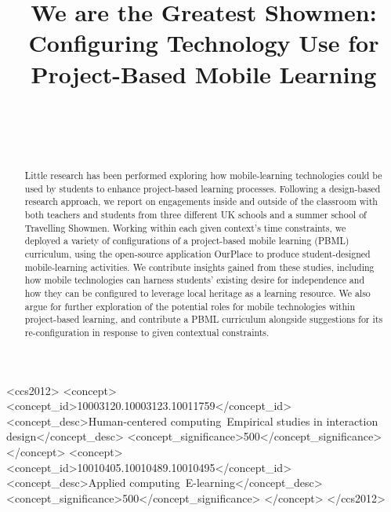 \documentclass[,hyphens]{sigchi}
\begin{document}
\title{We are the Greatest Showmen: Configuring Technology Use for Project-Based Mobile Learning}

\author{%
  \\
  \\
  \\
}

\maketitle

\begin{abstract}
Little research has been performed exploring how mobile-learning technologies could be used by students to enhance project-based learning processes. Following a design-based research approach, we report on engagements inside and outside of the classroom with both teachers and students from three different UK schools and a summer school of Travelling Showmen. Working within each given context's time constraints, we deployed a variety of configurations of a project-based mobile learning (PBML) curriculum, using the open-source application OurPlace to produce student-designed mobile-learning activities. We contribute insights gained from these studies, including how mobile technologies can harness students' existing desire for independence and how they can be configured to leverage local heritage as a learning resource. We also argue for further exploration of the potential roles for mobile technologies within project-based learning, and contribute a PBML curriculum alongside suggestions for its re-configuration in response to given contextual constraints.
\end{abstract}



\begin{CCSXML}
<ccs2012>
<concept>
<concept_id>10003120.10003123.10011759</concept_id>
<concept_desc>Human-centered computing~Empirical studies in interaction design</concept_desc>
<concept_significance>500</concept_significance>
</concept>
<concept>
<concept_id>10010405.10010489.10010495</concept_id>
<concept_desc>Applied computing~E-learning</concept_desc>
<concept_significance>500</concept_significance>
</concept>
</ccs2012>
\end{CCSXML}
\end{document}

